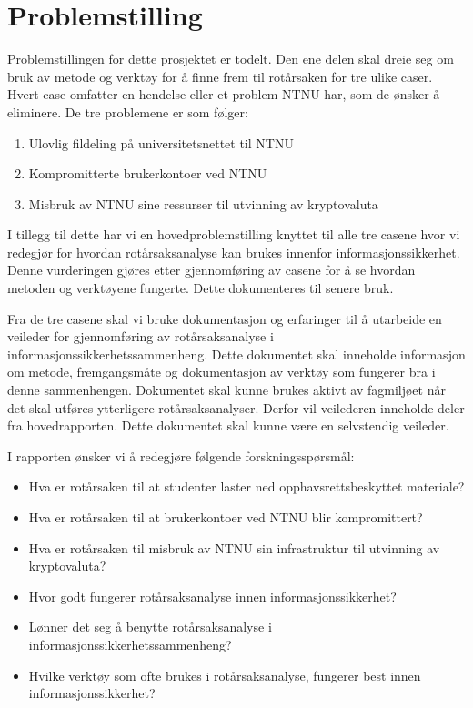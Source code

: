 \section{Problemstilling}

\label{sec:problemstilling}
Problemstillingen for dette prosjektet er todelt. Den ene delen skal dreie seg om bruk av metode og verktøy for å finne frem til rotårsaken for tre ulike caser. Hvert case omfatter en hendelse eller et problem NTNU har, som de ønsker å eliminere. De tre problemene er som følger: 

\begin{enumerate}
    \item Ulovlig fildeling på universitetsnettet til NTNU
    \item Kompromitterte brukerkontoer ved NTNU
    \item Misbruk av NTNU sine ressurser til utvinning av kryptovaluta
\end{enumerate}

I tillegg til dette har vi en hovedproblemstilling knyttet til alle tre casene hvor vi redegjør for hvordan rotårsaksanalyse kan brukes innenfor informasjonssikkerhet. Denne vurderingen gjøres etter gjennomføring av casene for å se hvordan metoden og verktøyene fungerte. Dette dokumenteres til senere bruk.

Fra de tre casene skal vi bruke dokumentasjon og erfaringer til å utarbeide en veileder for gjennomføring av rotårsaksanalyse i informasjonssikkerhetssammenheng. Dette dokumentet skal inneholde informasjon om metode, fremgangsmåte og dokumentasjon av verktøy som fungerer bra i denne sammenhengen. Dokumentet skal kunne brukes aktivt av fagmiljøet når det skal utføres ytterligere rotårsaksanalyser. Derfor vil veilederen inneholde deler fra hovedrapporten. Dette dokumentet skal kunne være en selvstendig veileder.

I rapporten ønsker vi å redegjøre følgende forskningsspørsmål:

\begin{itemize}
    \item Hva er rotårsaken til at studenter laster ned opphavsrettsbeskyttet materiale?
    \item Hva er rotårsaken til at brukerkontoer ved NTNU blir kompromittert?
    \item Hva er rotårsaken til misbruk av NTNU sin infrastruktur til utvinning av kryptovaluta?
    \item Hvor godt fungerer rotårsaksanalyse innen informasjonssikkerhet?
    \item Lønner det seg å benytte rotårsaksanalyse i informasjonssikkerhetssammenheng?
    \item Hvilke verktøy som ofte brukes i rotårsaksanalyse, fungerer best innen informasjonssikkerhet?
\end{itemize}